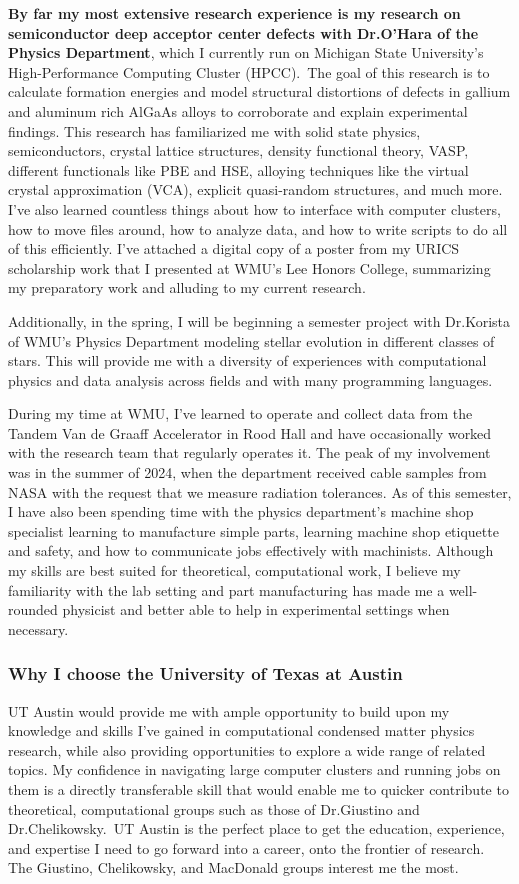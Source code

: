 \documentclass[11pt]{article}
\newcommand{\school}{University of Texas at Austin}
\newcommand{\schoolabbr}{UT Austin}
\begin{document}
\textbf{By far my most extensive research experience is my research on semiconductor deep acceptor center defects with Dr.\@ O'Hara of the Physics Department}, which I currently run on Michigan State University's High-Performance Computing Cluster (HPCC).\ The goal of this research is to calculate formation energies and model structural distortions of defects in gallium and aluminum rich AlGaAs alloys to corroborate and explain experimental findings. This research has familiarized me with solid state physics, semiconductors, crystal lattice structures, density functional theory, VASP, different functionals like PBE and HSE, alloying techniques like the virtual crystal approximation (VCA), explicit quasi-random structures, and much more. I've also learned countless things about how to interface with computer clusters, how to move files around, how to analyze data, and how to write scripts to do all of this efficiently. I've attached a digital copy of a poster from my URICS scholarship work that I presented at WMU's Lee Honors College, summarizing my preparatory work and alluding to my current research.
\pagebreak

Additionally, in the spring, I will be beginning a semester project with Dr.\@ Korista of WMU's Physics Department modeling stellar evolution in different classes of stars. This will provide me with a diversity of experiences with computational physics and data analysis across fields and with many programming languages.

During my time at WMU, I've learned to operate and collect data from the Tandem Van de Graaff Accelerator in Rood Hall and have occasionally worked with the research team that regularly operates it. The peak of my involvement was in the summer of 2024, when the department received cable samples from NASA with the request that we measure radiation tolerances. As of this semester, I have also been spending time with the physics department's machine shop specialist learning to manufacture simple parts, learning machine shop etiquette and safety, and how to communicate jobs effectively with machinists. Although my skills are best suited for theoretical, computational work, I believe my familiarity with the lab setting and part manufacturing has made me a well-rounded physicist and better able to help in experimental settings when necessary.

\subsubsection*{Why I choose the \school{}}
\schoolabbr{} would provide me with ample opportunity to build upon my knowledge and skills I've gained in computational condensed matter physics research, while also providing opportunities to explore a wide range of related topics. My confidence in navigating large computer clusters and running jobs on them is a directly transferable skill that would enable me to quicker contribute to theoretical, computational groups such as those of Dr.\@ Giustino and Dr.\@ Chelikowsky.\ \schoolabbr{} is the perfect place to get the education, experience, and expertise I need to go forward into a career, onto the frontier of research. The Giustino, Chelikowsky, and MacDonald groups interest me the most.
\end{document}
